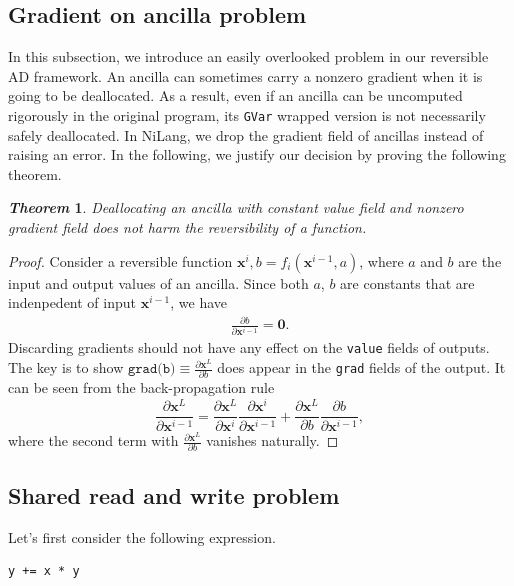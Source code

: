 \documentclass{article}
\newcommand{\<}{\langle}
\renewcommand{\>}{\rangle}
\newcommand{\vx}{{\mathbf{x}}}
\newtheorem{theorem}{\textit{Theorem}}
\theoremstyle{definition}\newtheorem{definition}{\textit{Definition}}
\begin{document}
\subsection{Gradient on ancilla problem}
In this subsection, we introduce an easily overlooked problem in our reversible AD framework.
An ancilla can sometimes carry a nonzero gradient when it is going to be deallocated. As a result, even if an ancilla can be uncomputed rigorously in the original program, its \texttt{GVar} wrapped version is not necessarily safely deallocated.
In NiLang, we drop the gradient field of ancillas instead of raising an error.
In the following, we justify our decision by proving the following theorem.
\begin{theorem}
    Deallocating an ancilla with constant value field and nonzero gradient field does not harm the reversibility of a function.
\end{theorem}
\begin{proof}
    Consider a reversible function $\vx^i, b = f_i(\vx^{i-1}, a)$, where $a$ and $b$ are the input and output values of an ancilla.
    Since both $a$, $b$ are constants that are indenpedent of input $\vx^{i-1}$, we have
\begin{align}
    \frac{\partial b}{\partial \vx^{i-1}} = \mathbf{0}.
\end{align}
Discarding gradients should not have any effect on the \texttt{value} fields of outputs.
    The key is to show $\texttt{grad(b)} \equiv \frac{\partial \vx^L}{\partial{b}}$ does appear in the \texttt{grad} fields of the output. It can be seen from the back-propagation rule 
\begin{equation}
    \frac{\partial \vx^L}{\partial \vx^{i-1}} = \frac{\partial \vx^L}{\partial \vx^i}\frac{\partial \vx^i}{\partial \vx^{i-1}} + \frac{\partial \vx^L}{\partial b}\frac{\partial b}{\partial \vx^{i-1}},
\end{equation}
where the second term with $\frac{\partial \vx^L}{\partial{b}}$ vanishes naturally.
\end{proof}

\subsection{Shared read and write problem}
Let's first consider the following expression.

\begin{minipage}{.88\columnwidth}
\begin{lstlisting}
y += x * y
\end{lstlisting}
\end{minipage}
\end{document}
